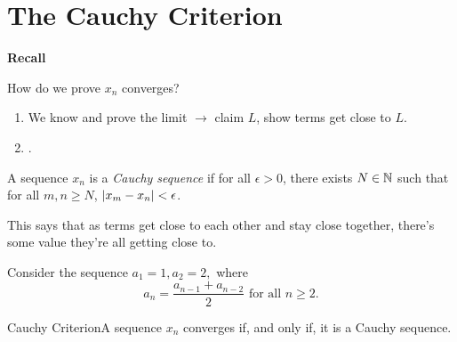 \section{The Cauchy Criterion}

\begin{center}
    \textbf{Recall}
\end{center}
How do we prove \(x_n\) converges?
\begin{enumerate}
    \item We know and prove the limit \(\rightarrow\) claim \(L\), show terms get close to \(L\).
    \item {}.
\end{enumerate}

\begin{definition}
    A sequence \(x_n\) is a \textit{Cauchy sequence} if for all \(\epsilon > 0\), there exists \(N \in \mathbb{N}\) such that for all \(m,n \geq N\), \(\left|x_m - x_n\right| < \epsilon\).
\end{definition}

This says that as terms get close to each other and stay close together, there's some value they're all getting close to.

\begin{example}
    Consider the sequence \(a_1 = 1, a_2 = 2,\) where \[a_n = \frac{a_{n-1} + a_{n-2}}{2} \text{ for all } n \geq 2.\]
\end{example}


\begin{ntheorem}
    {Cauchy Criterion}A sequence \(x_n\) converges if, and only if, it is a Cauchy sequence.
\end{ntheorem}

